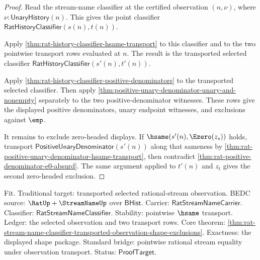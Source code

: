 \begin{proof}
Read the stream-name classifier at the certified observation $(n,\nu)$, where
$\nu:\mathsf{UnaryHistory}(n)$. This gives the point classifier
$\mathsf{RatHistoryClassifier}(s(n),t(n))$.

Apply \autoref{thm:rat-history-classifier-hsame-transport} to this classifier
and to the two pointwise transport rows evaluated at $n$. The result is the
transported selected classifier
$\mathsf{RatHistoryClassifier}(s'(n),t'(n))$.

Apply \autoref{thm:rat-history-classifier-positive-denominators} to the
transported selected classifier. Then apply
\autoref{thm:positive-unary-denominator-unary-and-nonempty} separately to the
two positive-denominator witnesses. These rows give the displayed positive
denominators, unary endpoint witnesses, and exclusions against $\emp$.

It remains to exclude zero-headed displays. If $\hsame(s'(n),\Ezero(z_s))$
holds, transport $\mathsf{PositiveUnaryDenominator}(s'(n))$ along that sameness
by \autoref{thm:rat-positive-unary-denominator-hsame-transport}, then contradict
\autoref{thm:rat-positive-denominator-e0-absurd}. The same argument applied to
$t'(n)$ and $z_t$ gives the second zero-headed exclusion.
\end{proof}

Fit. Traditional target: transported selected rational-stream observation.
BEDC source: $\RatUp+\StreamNameUp$ over $\mathsf{BHist}$. Carrier:
$\mathsf{RatStreamNameCarrier}$. Classifier:
$\mathsf{RatStreamNameClassifier}$. Stability: pointwise $\hsame$ transport.
Ledger: the selected observation and two transport rows. Core theorem:
\autoref{thm:rat-stream-name-classifier-transported-observation-shape-exclusions}.
Exactness: the displayed shape package. Standard bridge: pointwise rational
stream equality under observation transport. Status: $\mathsf{ProofTarget}$.

